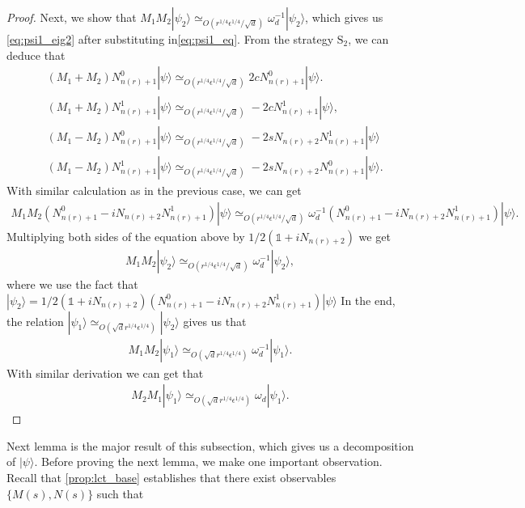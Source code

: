 \documentclass[11pt,letterpaper]{article}
\newcommand{\ket}[1]{|#1\rangle}
\newcommand{\1}{\mathbb{1}}
\newcommand{\nr}{n(r)}
\newcommand{\bS}{\mathrm{S}}
\newcommand{\qe}{\epsilon^{1/4}}
\newcommand{\sd}{\sqrt{d}}
\newcommand{\qr}{r^{1/4}}
\newcommand{\appd}[1]{\simeq_{#1}}
\theoremstyle{definition}
\begin{document}
\begin{proof}
	Next, we show that $M_1M_2 \ket{\psi_2}\appd{O(\qr \qe/\sd)} \omega_d^{-1} \ket{\psi_2}$, which gives
	us \cref{eq:psi1_eig2} after substituting in\cref{eq:psi1_eq}.
	From the strategy $\bS_2$, we can deduce that 
	\begin{align}
		&(M_1+M_2) N_{\nr+1}^0 \ket{\psi} \appd{O(\qr \qe/\sd)} 2c N_{\nr+1}^0 \ket{\psi}.\\
		&(M_1+M_2) N_{\nr+1}^1 \ket{\psi}  \appd{O(\qr \qe/\sd)} -2cN_{\nr+1}^1 \ket{\psi},\\
		&(M_1-M_2) N_{\nr+1}^0\ket{\psi} \appd{O(\qr\qe/\sd)}-2sN_{\nr+2} N_{\nr+1}^1\ket{\psi}\\
		&(M_1-M_2)N_{\nr+1}^1 \ket{\psi} \appd{O(\qr\qe/\sd)} -2sN_{\nr+2} N_{\nr+1}^0 \ket{\psi}.
	\end{align}
	With similar calculation as in the previous case, we can get 
	\begin{align*}
		M_1M_2 (N_{\nr+1}^0 - i N_{\nr+2}N_{\nr+1}^1) \ket{\psi} \appd{O(\qr \qe/\sd)} 
		\omega_d^{-1} (N_{\nr+1}^0 - i N_{\nr+2}N_{\nr+1}^1)\ket{\psi} .
	\end{align*}
	Multiplying both sides of the equation above by $1/2(\1+iN_{\nr+2})$ we get
	\begin{align}
		M_1M_2 \ket{\psi_2} \appd{O(\qr \qe/\sd)} \omega_d^{-1}\ket{\psi_2},
	\end{align}
	where we use the fact that $\ket{\psi_2} = 1/2(\1+iN_{\nr+2})(N_{\nr+1}^0 - i N_{\nr+2}N_{\nr+1}^1) \ket{\psi}$
	In the end, the relation $\ket{\psi_1}  \appd{O(\sd \qr\qe)} \ket{\psi_2}$ gives us that 
	\begin{align}
		M_1M_2 \ket{\psi_1} \appd{O(\sd \qr \qe)} \omega_d^{-1}\ket{\psi_1}.
	\end{align}
	With similar derivation we can get that 
	\begin{align}
	    M_2M_1 \ket{\psi_1} \appd{O(\sd \qr \qe)} \omega_d\ket{\psi_1}.
	\end{align}
\end{proof}
Next lemma is the major result of this subsection, which gives us a decomposition of $\ket{\psi}$.
Before proving the next lemma, we make one important observation.
Recall that \cref{prop:lct_base} establishes that there exist observables $\{M(s), N(s)\}$ such that 
\end{document}
